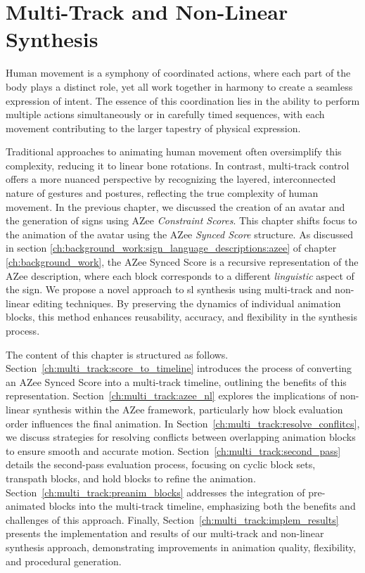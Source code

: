 \documentclass[../../main.tex]{subfiles}
\begin{document}
\chapter{Multi-Track and Non-Linear Synthesis}
\label{ch:multi_track}

Human movement is a symphony of coordinated actions, where each part of the body plays a distinct role, yet all work together in harmony to create a seamless expression of intent. The essence of this coordination lies in the ability to perform multiple actions simultaneously or in carefully timed sequences, with each movement contributing to the larger tapestry of physical expression.

Traditional approaches to animating human movement often oversimplify this complexity, reducing it to linear bone rotations. In contrast, multi-track control offers a more nuanced perspective by recognizing the layered, interconnected nature of gestures and postures, reflecting the true complexity of human movement. In the previous chapter, we discussed the creation of an avatar and the generation of signs using AZee \emph{Constraint Scores}. This chapter shifts focus to the animation of the avatar using the AZee \emph{Synced Score} structure. As discussed in section \ref{ch:background_work:sign_language_descriptions:azee} of chapter \ref{ch:background_work}, the AZee Synced Score is a recursive representation of the AZee description, where each block corresponds to a different \emph{linguistic} aspect of the sign. We propose a novel approach to \gls{sl} synthesis using multi-track and non-linear editing techniques. By preserving the dynamics of individual animation blocks, this method enhances reusability, accuracy, and flexibility in the synthesis process.

The content of this chapter is structured as follows. Section~\ref{ch:multi_track:score_to_timeline} introduces the process of converting an AZee Synced Score into a multi-track timeline, outlining the benefits of this representation. Section~\ref{ch:multi_track:azee_nl} explores the implications of non-linear synthesis within the AZee framework, particularly how block evaluation order influences the final animation. In Section~\ref{ch:multi_track:resolve_conflitcs}, we discuss strategies for resolving conflicts between overlapping animation blocks to ensure smooth and accurate motion. Section~\ref{ch:multi_track:second_pass} details the second-pass evaluation process, focusing on cyclic block sets, transpath blocks, and hold blocks to refine the animation. Section~\ref{ch:multi_track:preanim_blocks} addresses the integration of pre-animated blocks into the multi-track timeline, emphasizing both the benefits and challenges of this approach. Finally, Section~\ref{ch:multi_track:implem_results} presents the implementation and results of our multi-track and non-linear synthesis approach, demonstrating improvements in animation quality, flexibility, and procedural generation.
\end{document}
